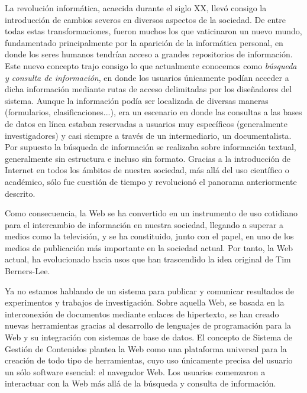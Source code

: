 La revolución informática, acaecida durante el siglo XX, llevó consigo la introducción de cambios severos en diversos aspectos de la sociedad. De entre todas estas transformaciones, fueron muchos los que vaticinaron un nuevo mundo, fundamentado principalmente por la aparición de la informática personal, en donde los seres humanos tendrían acceso a grandes repositorios de información. Este nuevo concepto trajo consigo lo que actualmente conocemos como \textit{búsqueda y consulta de información}, en donde los usuarios únicamente podían acceder a dicha información mediante rutas de acceso delimitadas por los diseñadores del sistema. Aunque la información podía ser localizada de diversas maneras (formularios, clasificaciones...), era un escenario en donde las consultas a las bases de datos en línea estaban reservadas a usuarios muy específicos (generalmente investigadores) y casi siempre a través de un intermediario, un documentalista. Por supuesto la búsqueda de información se realizaba sobre información textual, generalmente sin estructura e incluso sin formato. Gracias a la introducción de Internet en todos los ámbitos de nuestra sociedad, más allá del uso científico o académico, sólo fue cuestión de tiempo y revolucionó el panorama anteriormente descrito.


Como consecuencia, la Web se ha convertido en un instrumento de uso cotidiano para el intercambio de información en nuestra sociedad, llegando a superar a medios como la televisión, y se ha constituido, junto con el papel, en uno de los medios de publicación más importante en la sociedad actual. Por tanto, la Web actual, ha evolucionado hacia usos que han trascendido la idea original de Tim Berners-Lee.


Ya no estamos hablando de un sistema para publicar y comunicar resultados de experimentos y trabajos de investigación. Sobre aquella Web, se basada en la interconexión de documentos mediante enlaces de hipertexto, se han creado nuevas herramientas gracias al desarrollo de lenguajes de programación para la Web y su integración con sistemas de base de datos. El concepto de Sistema de Gestión de Contenidos plantea la Web como una plataforma universal para la creación de todo tipo de herramientas, cuyo uso únicamente precisa del usuario un sólo software esencial: el navegador Web. Los usuarios comenzaron a interactuar con la Web más allá de la búsqueda y consulta de información.

